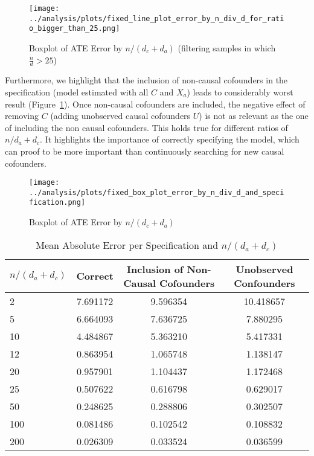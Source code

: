 \documentclass{article}
\numberwithin{equation}{section}
\begin{document}
\begin{figure}[H]
    \centering
    \texttt{[image: ../analysis/plots/fixed\_line\_plot\_error\_by\_n\_div\_d\_for\_ratio\_bigger\_than\_25.png]}
    \caption{Boxplot of ATE Error by $n / (d_c + d_a)$ (filtering samples in which $\frac{n}{d} > 25$)}
    \label{fig:ate_error_by_n_div_d}
\end{figure}

Furthermore, we highlight that the inclusion of non-causal cofounders in the specification (model estimated with all $C$ and $X_a$) leads to considerably worst result (Figure~\ref{fig:ate_error_by_n_div_d}). Once non-causal cofounders are included, the negative effect of removing $C$ (adding unobserved causal cofounders $U$) is not as relevant as the one of including the non causal cofounders. This holds true for different ratios of $n / d_a + d_c$. It highlights the importance of correctly specifying the model, which can proof to be more important than continuously searching for new causal cofounders.

\begin{figure}[H]
    \centering
    \texttt{[image: ../analysis/plots/fixed\_box\_plot\_error\_by\_n\_div\_d\_and\_specification.png]}
    \caption{Boxplot of ATE Error by $n / (d_c + d_a)$}
\end{figure}

\begin{table}[H]
    \centering
    \begin{tabular}{lccc}
        \toprule
        $n / (d_a + d_c)$ & Correct & Inclusion of Non-Causal Cofounders & Unobserved Confounders \\
        \midrule
        2 & 7.691172 & 9.596354 & 10.418657 \\
        5 & 6.664093 & 7.636725 & 7.880295 \\
        10 & 4.484867 & 5.363210 & 5.417331 \\
        12 & 0.863954 & 1.065748 & 1.138147 \\
        20 & 0.957901 & 1.104437 & 1.172468 \\
        25 & 0.507622 & 0.616798 & 0.629017 \\
        50 & 0.248625 & 0.288806 & 0.302507 \\
        100 & 0.081486 & 0.102542 & 0.108832 \\
        200 & 0.026309 & 0.033524 & 0.036599 \\
        \bottomrule
    \end{tabular}
    \caption{Mean Absolute Error per Specification and $n / (d_a + d_c)$}
\end{table}
\end{document}
